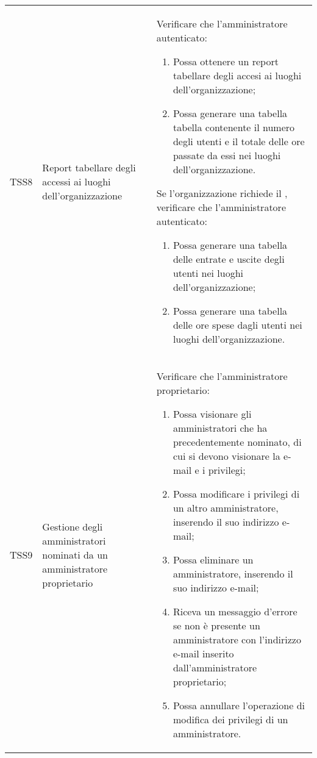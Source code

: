 {\begin{longtable}{ c  C{3cm}  C{11cm} }
TSS8 & Report tabellare degli accessi ai luoghi dell'organizzazione &
Verificare che l'amministratore autenticato:
\begin{enumerate}
    \item Possa ottenere un report tabellare degli accesi ai luoghi dell'organizzazione;
    \item Possa generare una tabella tabella contenente il numero degli utenti e il totale delle ore passate da essi nei luoghi dell’organizzazione.
\end{enumerate}
Se l'organizzazione richiede il , verificare che l'amministratore autenticato:
\begin{enumerate}
    \item Possa generare una tabella delle entrate e uscite degli utenti nei luoghi dell'organizzazione;
    \item Possa generare una tabella delle ore spese dagli utenti nei luoghi dell'organizzazione.
\end{enumerate} \\

TSS9 & Gestione degli amministratori nominati da un amministratore proprietario & 
Verificare che l'amministratore proprietario:
\begin{enumerate}
    \item Possa visionare gli amministratori che ha precedentemente nominato, di cui si devono visionare la e-mail e i privilegi;
    \item Possa modificare i privilegi di un altro amministratore, inserendo il suo indirizzo e-mail;
    \item Possa eliminare un amministratore, inserendo il suo indirizzo e-mail; 
    \item Riceva un messaggio d'errore se non è presente un amministratore con l'indirizzo e-mail inserito dall'amministratore proprietario;
    \item Possa annullare l'operazione di modifica dei privilegi di un amministratore.
\end{enumerate} \\


\end{longtable}}
